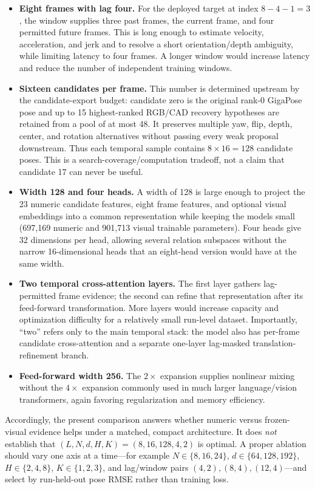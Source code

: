 \documentclass[11pt]{article}
\begin{document}
\begin{itemize}
\item \textbf{Eight frames with lag four.}  For the deployed target at index $8-4-1=3$, the window supplies three past frames, the current frame, and four permitted future frames.  This is long enough to estimate velocity, acceleration, and jerk and to resolve a short orientation/depth ambiguity, while limiting latency to four frames.  A longer window would increase latency and reduce the number of independent training windows.
\item \textbf{Sixteen candidates per frame.}  This number is determined upstream by the candidate-export budget: candidate zero is the original rank-0 GigaPose pose and up to 15 highest-ranked RGB/CAD recovery hypotheses are retained from a pool of at most 48.  It preserves multiple yaw, flip, depth, center, and rotation alternatives without passing every weak proposal downstream.  Thus each temporal sample contains $8\times16=128$ candidate poses.  This is a search-coverage/computation tradeoff, not a claim that candidate 17 can never be useful.
\item \textbf{Width 128 and four heads.}  A width of 128 is large enough to project the 23 numeric candidate features, eight frame features, and optional visual embeddings into a common representation while keeping the models small (697,169 numeric and 901,713 visual trainable parameters).  Four heads give 32 dimensions per head, allowing several relation subspaces without the narrow 16-dimensional heads that an eight-head version would have at the same width.
\item \textbf{Two temporal cross-attention layers.}  The first layer gathers lag-permitted frame evidence; the second can refine that representation after its feed-forward transformation.  More layers would increase capacity and optimization difficulty for a relatively small run-level dataset.  Importantly, ``two'' refers only to the main temporal stack: the model also has per-frame candidate cross-attention and a separate one-layer lag-masked translation-refinement branch.
\item \textbf{Feed-forward width 256.}  The $2\times$ expansion supplies nonlinear mixing without the $4\times$ expansion commonly used in much larger language/vision transformers, again favoring regularization and memory efficiency.
\end{itemize}

Accordingly, the present comparison answers whether numeric versus frozen-visual evidence helps under a matched, compact architecture.  It does \emph{not} establish that $(L,N,d,H,K)=(8,16,128,4,2)$ is optimal.  A proper ablation should vary one axis at a time---for example $N\in\{8,16,24\}$, $d\in\{64,128,192\}$, $H\in\{2,4,8\}$, $K\in\{1,2,3\}$, and lag/window pairs $(4,2),(8,4),(12,4)$---and select by run-held-out pose RMSE rather than training loss.
\end{document}
